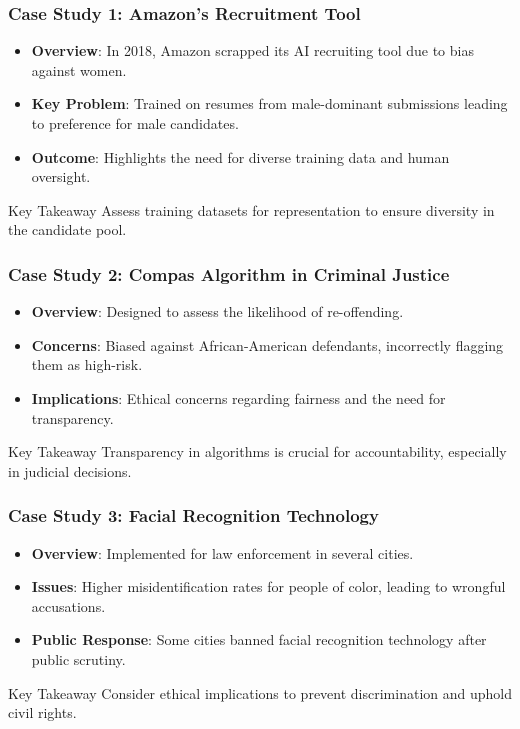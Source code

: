 \documentclass[aspectratio=169]{beamer}
\begin{document}
\begin{frame}[fragile]
    \frametitle{Case Study 1: Amazon's Recruitment Tool}
    \begin{itemize}
        \item \textbf{Overview}: In 2018, Amazon scrapped its AI recruiting tool due to bias against women.
        \item \textbf{Key Problem}: Trained on resumes from male-dominant submissions leading to preference for male candidates.
        \item \textbf{Outcome}: Highlights the need for diverse training data and human oversight.
    \end{itemize}
    \begin{block}{Key Takeaway}
        Assess training datasets for representation to ensure diversity in the candidate pool.
    \end{block}
\end{frame}

\begin{frame}[fragile]
    \frametitle{Case Study 2: Compas Algorithm in Criminal Justice}
    \begin{itemize}
        \item \textbf{Overview}: Designed to assess the likelihood of re-offending.
        \item \textbf{Concerns}: Biased against African-American defendants, incorrectly flagging them as high-risk.
        \item \textbf{Implications}: Ethical concerns regarding fairness and the need for transparency.
    \end{itemize}
    \begin{block}{Key Takeaway}
        Transparency in algorithms is crucial for accountability, especially in judicial decisions.
    \end{block}
\end{frame}

\begin{frame}[fragile]
    \frametitle{Case Study 3: Facial Recognition Technology}
    \begin{itemize}
        \item \textbf{Overview}: Implemented for law enforcement in several cities.
        \item \textbf{Issues}: Higher misidentification rates for people of color, leading to wrongful accusations.
        \item \textbf{Public Response}: Some cities banned facial recognition technology after public scrutiny.
    \end{itemize}
    \begin{block}{Key Takeaway}
        Consider ethical implications to prevent discrimination and uphold civil rights.
    \end{block}
\end{frame}
\end{document}

